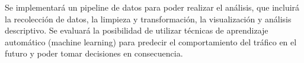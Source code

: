 \documentclass[12pt]{article}
\begin{document}
Se implementará un pipeline de datos para poder realizar el análisis, que incluirá la recolección de datos, la limpieza y transformación, la visualización y análisis descriptivo. Se evaluará la posibilidad de utilizar técnicas de aprendizaje automático (machine learning) para predecir el comportamiento del tráfico en el futuro y poder tomar decisiones en consecuencia.

\printbibliography
\end{document}
